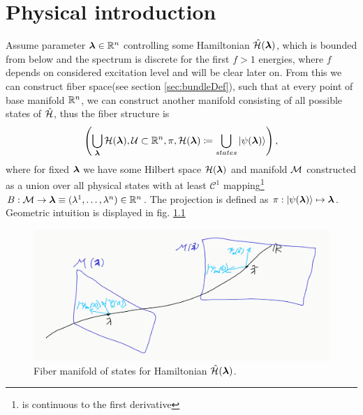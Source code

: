 \chapter{Physical introduction}


Assume parameter ${\bm\lambda}\in\mathbb{R}^n$ controlling some Hamiltonian $\hat{\mathcal{H}}({\bm\lambda})$, which is bounded from below and the spectrum is discrete for the first $f>1$ energies, where $f$ depends on considered excitation level and will be clear later on. From this we can construct fiber space(see section \ref{sec:bundleDef}), such that at every point of base manifold $\mathbb{R}^n$, we can construct another manifold consisting of all possible states of $\hat{\mathcal{H}}$, thus the fiber structure is
$$\left(\bigcup_{\bm\lambda} \mathcal{H}({\bm\lambda}),\mathcal{U}\subset \mathbb{R}^n,\pi, \mathcal{H}({\bm\lambda}) \coloneqq \bigcup_{states}\ket{\psi({\bm\lambda})}  \right),$$
where for fixed ${\bm\lambda}$ we have some Hilbert space $\mathcal{H}({\bm\lambda})$ and manifold $\mathcal{M}$ constructed as a union over all physical states with at least $\mathcal{C}^1$ mapping\footnote{is continuous to the first derivative} $B: \mathcal{M}\rightarrow \bm{{\bm\lambda}}\equiv (\lambda^1,\dots,\lambda^n)\in\mathbb{R}^n$. The projection is defined as $\pi: \ket{\psi({\bm\lambda})}\mapsto {\bm\lambda}$. Geometric intuition is displayed in fig. \ref{fig:wholeBundle}
\begin{figure}[h]
    \centering
    \includegraphics[width=\textwidth]{../img/wholeBundle.png}
\caption{Fiber manifold of states for Hamiltonian $\hat{\mathcal{H}}({\bm\lambda})$.}
    \label{fig:wholeBundle}
\end{figure}

